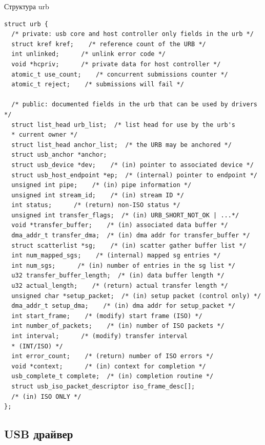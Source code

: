 \begin{longlisting}
	\singlespacing
	\caption{Структура urb}
	\label{lst:urb}
	\begin{verbatim}
struct urb {
  /* private: usb core and host controller only fields in the urb */
  struct kref kref;    /* reference count of the URB */
  int unlinked;      /* unlink error code */
  void *hcpriv;      /* private data for host controller */
  atomic_t use_count;    /* concurrent submissions counter */
  atomic_t reject;    /* submissions will fail */

  /* public: documented fields in the urb that can be used by drivers */
  struct list_head urb_list;  /* list head for use by the urb's
  * current owner */
  struct list_head anchor_list;  /* the URB may be anchored */
  struct usb_anchor *anchor;
  struct usb_device *dev;    /* (in) pointer to associated device */
  struct usb_host_endpoint *ep;  /* (internal) pointer to endpoint */
  unsigned int pipe;    /* (in) pipe information */
  unsigned int stream_id;    /* (in) stream ID */
  int status;      /* (return) non-ISO status */
  unsigned int transfer_flags;  /* (in) URB_SHORT_NOT_OK | ...*/
  void *transfer_buffer;    /* (in) associated data buffer */
  dma_addr_t transfer_dma;  /* (in) dma addr for transfer_buffer */
  struct scatterlist *sg;    /* (in) scatter gather buffer list */
  int num_mapped_sgs;    /* (internal) mapped sg entries */
  int num_sgs;      /* (in) number of entries in the sg list */
  u32 transfer_buffer_length;  /* (in) data buffer length */
  u32 actual_length;    /* (return) actual transfer length */
  unsigned char *setup_packet;  /* (in) setup packet (control only) */
  dma_addr_t setup_dma;    /* (in) dma addr for setup_packet */
  int start_frame;    /* (modify) start frame (ISO) */
  int number_of_packets;    /* (in) number of ISO packets */
  int interval;      /* (modify) transfer interval
  * (INT/ISO) */
  int error_count;    /* (return) number of ISO errors */
  void *context;      /* (in) context for completion */
  usb_complete_t complete;  /* (in) completion routine */
  struct usb_iso_packet_descriptor iso_frame_desc[];
  /* (in) ISO ONLY */
};
	\end{verbatim}
\end{longlisting}

\subsection{USB драйвер}

